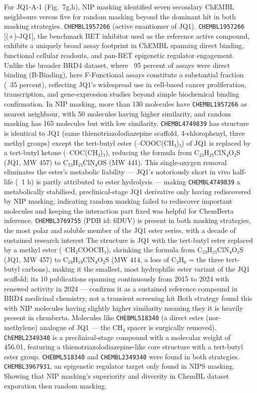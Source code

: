 \documentclass[a4paper,12pt]{article}
\begin{document}
For JQ1-A-1 (Fig.~7g,h),  NIP masking identified seven secondary ChEMBL
neighbours versus five for random masking beyond the dominant hit in both masking strategies.
\texttt{CHEMBL1957266} (active enantiomer of JQ1). \texttt{CHEMBL1957266} [(+)-JQ1], the benchmark BET inhibitor used as the reference active compound, exhibits a uniquely broad assay footprint in ChEMBL spanning direct binding, functional cellular readouts, and pan-BET epigenetic regulator engagement. Unlike the broader BRD4 dataset, where ~95 percent of assays were direct binding (B-Binding), here F-Functional assays constitute a substantial fraction (~35 percent), reflecting JQ1's widespread use in cell-based cancer proliferation, transcription, and gene-expression studies beyond simple biochemical binding confirmation. In NIP masking, more than 130 molecules have  \texttt{CHEMBL1957266} as nearest neighbour, with 50 molecules having higher similarity, and random masking has 165 molecules but with low similarity. \texttt{CHEMBL4749839} has structure is identical to JQ1 (same thienotriazolodiazepine scaffold, 4-chlorophenyl, three methyl groups) except the tert-butyl ester (–COOC(CH₃)₃) of JQ1 is replaced by a tert-butyl ketone (–COC(CH₃)₃), reducing the formula from C₂₃H₂₅ClN₄O₂S (JQ1, MW 457) to C₂₃H₂₅ClN₄OS (MW 441). This single-oxygen removal eliminates the ester's metabolic liability — JQ1's notoriously short in vivo half-life (~1 h) is partly attributed to ester hydrolysis — making \texttt{CHEMBL4749839} a metabolically stabilised, preclinical-stage JQ1 derivative only having rediscovered by NIP masking, indicating random masking failed to rediscover important molecules and keeping the interaction part fixed was helpful for ChemBerta inference. \texttt{CHEMBL3769755} (PDB id: 6DUV) is present in both masking  strategies, the most polar and soluble member of the JQ1 ester series, with a decade of sustained research interest
The structure is JQ1 with the tert-butyl ester replaced by a methyl ester (–CH₂COOCH₃), shrinking the formula from C₂₃H₂₅ClN₄O₂S (JQ1, MW 457) to C₂₀H₁₉ClN₄O₂S (MW 414, a loss of C₃H₆ = the three tert-butyl carbons), making it the smallest, most hydrophilic ester variant of the JQ1 scaffold; its 10 publications spanning continuously from 2015 to 2024 with renewed activity in 2024 — confirms it as a sustained reference compound in BRD4 medicinal chemistry, not a transient screening hit Both strategy found this with NIP molecules having slightly higher similarity meaning they it is heavily present in chemberta. Molecules like \texttt{CHEBML518340}  (a direct ester (nor-methylene) analogue of JQ1 — the CH₂ spacer is surgically removed). \texttt{ChEMBL2349340} is a preclinical-stage compound with a molecular weight of 456.01, featuring a thienotriazolodiazepine-like core structure with a tert-butyl ester group. \texttt{CHEBML518340} and  \texttt{CHEMBL2349340} were found in both strategies. \texttt{CHEMBL3967931}, an epigenetic regulator target only found in NIPS masking. Showing that NIP masking's superiority and diversity in ChemBL dataset exporation then random masking.  
\end{document}
